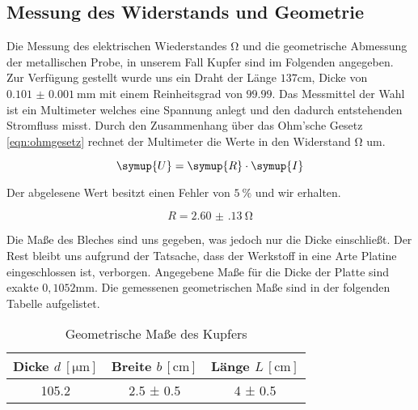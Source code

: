 \subsection{Messung des Widerstands und Geometrie}
\label{sec:aufgabe_a}
Die Messung des elektrischen Wiederstandes $\si{\ohm}$ und die geometrische Abmessung der metallischen Probe, in unserem Fall Kupfer sind im Folgenden angegeben.
Zur Verfügung gestellt wurde uns ein Draht der Länge $137\si{\cm}$, Dicke von $\SI{0.101(1)}{\milli\meter}$ mit einem Reinheitsgrad von $99.99$. 
Das Messmittel der Wahl ist ein Multimeter welches eine Spannung anlegt und den dadurch entstehenden Stromfluss misst.
Durch den Zusammenhang über das Ohm'sche Gesetz \eqref{eqn:ohmgesetz} rechnet der Multimeter die Werte in den Widerstand $\si{\ohm}$ um.

\begin{equation}
   \symup{U} = \symup{R} \cdot \symup{I}
\end{equation}

Der abgelesene Wert besitzt einen Fehler von $\SI{5}{\percent}$ und wir erhalten.

\begin{equation}
\label{eqn:ohmgesetz}
R = \SI{2.60(13)}{\ohm}
\end{equation}

Die Maße des Bleches sind uns gegeben, was jedoch nur die Dicke einschließt. %
Der Rest bleibt uns aufgrund der Tatsache, dass der Werkstoff in eine Arte Platine eingeschlossen ist, verborgen.
Angegebene Maße für die Dicke der Platte sind exakte $0,1052\si{\mm}$.
Die gemessenen geometrischen Maße sind in der folgenden Tabelle aufgelistet.

\begin{table}
  \centering
  \caption{Geometrische Maße des Kupfers}
  \label{tab:kupfergeo}
  \begin{tabular}{c c c}
    Dicke {$d \: [\si{\micro\meter}]$} & Breite $b \, [\si{\centi\meter}]$ & Länge $L \, [\si{\centi\meter}]$ \\
    \midrule
    105.2   & 2.5 ± 0.5 & 4 ± 0.5 \\
    \bottomrule
  \end{tabular}
\end{table}